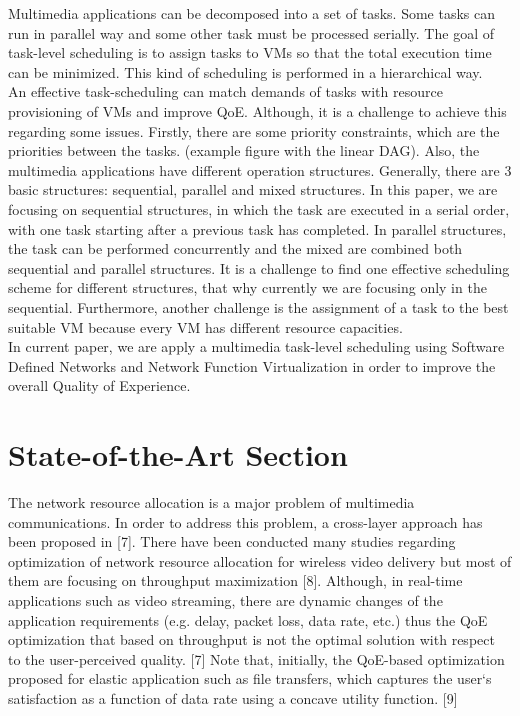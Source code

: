 \documentclass[a4paper]{article}
\begin{document}
Multimedia applications can be decomposed into a set of tasks. Some tasks can run in parallel way and some other task must be processed serially. The goal of task-level scheduling is to assign tasks to VMs so that the total execution time can be minimized. This kind of scheduling is performed in a hierarchical way.\\

An effective task-scheduling can match demands of tasks with resource provisioning of VMs and improve QoE. Although, it is a challenge to achieve this regarding some issues. Firstly, there are some priority constraints, which are the priorities between the tasks. (example figure with the linear DAG). Also, the multimedia applications have different operation structures. Generally, there are 3 basic structures: sequential, parallel and mixed structures. In this paper, we are focusing on sequential structures, in which the task are executed in a serial order, with one task starting after a previous task has completed. In parallel structures, the task can be performed concurrently and the mixed are combined both sequential and parallel structures. It is a challenge to find one effective scheduling scheme for different structures, that why currently we are focusing only in the sequential. Furthermore, another challenge is the assignment of a task to the best suitable VM because every VM has different resource capacities. \\

In current paper, we are apply a multimedia task-level scheduling using Software Defined Networks and Network Function Virtualization in order to improve the overall Quality of Experience.  




\section{State-of-the-Art Section}

 The network resource allocation is a major problem of multimedia communications. In order to address this problem, a cross-layer approach has been proposed in [7]. There have been conducted many studies regarding optimization of network resource allocation for wireless video delivery but most of them are focusing on throughput maximization [8]. Although, in real-time applications such as video streaming, there are dynamic changes of the application requirements (e.g. delay, packet loss, data rate, etc.) thus the QoE optimization that based on throughput is not the optimal solution with respect to the user-perceived quality. [7] Note that, initially, the QoE-based optimization proposed for elastic application such as file transfers, which captures the user`s satisfaction as a function of data rate using a concave utility function. [9]\\
\end{document}
